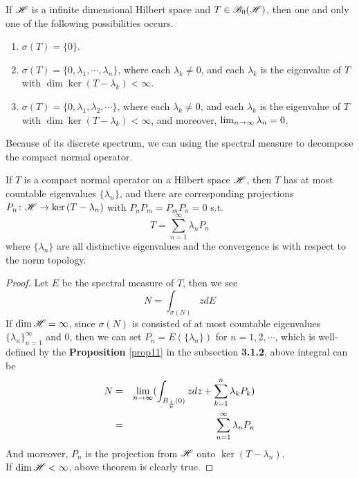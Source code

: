 \documentclass[a4paper,11pt]{report}
\begin{document}
\begin{thm}[Riesz]
	If $\mathscr{H}$ is a infinite dimensional Hilbert space and $T \in \mathscr{B}_{0}\mathscr{(H)}$, then one and only one of the following possibilities occurs.
	\begin{enumerate}[label=\arabic*)]
		\item $\sigma(T) = \{0\}$.
		\item $\sigma(T) = \{0,\lambda_1,\cdots,\lambda_n\}$, where each $\lambda_k \neq 0$, and each $\lambda_k$ is the eigenvalue of $T$ with $\dim{\ker{(T-\lambda_k)}}<\infty$.
		\item $\sigma(T) = \{0,\lambda_1,\lambda_2,\cdots\}$, where each $\lambda_k \neq 0$, and each $\lambda_k$ is the eigenvalue of $T$ with $\dim{\ker{(T-\lambda_k)}}<\infty$, and moreover, $\lim_{n \rightarrow \infty} \lambda_n =0$.
	\end{enumerate}
\end{thm}

Because of its discrete spectrum, we can using the spectral measure to decompose the compact normal operator.

\begin{thm}
	If $T$ is a compact normal operator on a Hilbert space $\mathscr{H}$, then $T$ has at most countable eigenvalues $\{\lambda_n\}$, and there are corresponding projections $P_n \colon \mathscr{H} \rightarrow \ker{(T-\lambda_n)}$ with $P_nP_m=P_mP_n=0$ s.t.
	\begin{equation*}
		T = \sum_{n=1}^{\infty} \lambda_n P_n
	\end{equation*}
	where $\{\lambda_n\}$ are all distinctive eigenvalues and the convergence is with respect to the norm topology.
\end{thm}
\begin{proof}
	Let $E$ be the spectral measure of $T$, then we see
	\begin{equation*}
		N = \int_{\sigma(N)} z dE
	\end{equation*}
	If $\dim{\mathscr{H}} = \infty$, since $\sigma(N)$ is consisted of at most countable eigenvalues $\{\lambda_n\}_{n=1}^{\infty}$ and $0$, then we can set $P_n = E(\{\lambda_n\})$ for $n = 1,2,\cdots$, which is well-defined by the \textbf{Proposition} \ref{prop11} in the subsection \textbf{3.1.2}, above integral can be
	\begin{eqnarray*}
		N &=& \lim_{n \rightarrow \infty} (\int_{B_{\frac{1}{n}}(0)} z dz + \sum_{k=1}^{n} \lambda_k P_k) \\
		&=& \sum_{n=1}^{\infty} \lambda_n P_n
	\end{eqnarray*} 
	And moreover, $P_n$ is the projection from $\mathscr{H}$ onto $\ker{(T-\lambda_n)}$. \\
	If $\dim{\mathscr{H}} < \infty$, above theorem is clearly true.
\end{proof}
\end{document}
